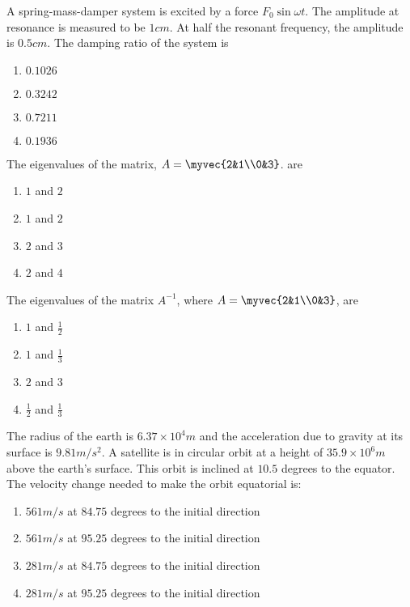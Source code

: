 	\item A spring-mass-damper system is excited by a force $F_0 \sin \omega t$. The amplitude at resonance is measured to be $1cm$. At half the resonant frequency, the amplitude is $0.5cm$. The damping ratio of the system is
		\begin{enumerate}
			\item $0.1026$
			\item $0.3242$
			\item $0.7211$
			\item $0.1936$
		\end{enumerate}

	\item The eigenvalues of the matrix, $A = \myvec{2&1\\0&3}$. are
		\begin{enumerate}
			\item $1$ and $2$
			\item $1$ and $2$
			\item $2$ and $3$
			\item $2$ and $4$
		\end{enumerate}

	\item The eigenvalues of the matrix $A^{-1}$, where $A = \myvec{2&1\\0&3}$, are
		\begin{enumerate}
			\item $1$ and $\frac{1}{2}$
			\item $1$ and $\frac{1}{3}$
			\item $2$ and $3$
			\item $\frac{1}{2}$ and $\frac{1}{3}$
		\end{enumerate}

	\item The radius of the earth is $6.37 \times 10^4 m$ and the acceleration due to gravity at its surface is $9.81 m / s^2$. A satellite is in circular orbit at a height of $35.9\times 10^6 m$ above the earth's surface. This orbit is inclined at $10.5$ degrees to the equator. The velocity change needed to make the orbit equatorial is:
		\begin{enumerate}
			\item $561 m / s$ at $84.75$ degrees to the initial direction
			\item $561 m / s$ at $95.25$ degrees to the initial direction
			\item $281 m / s$ at $84.75$ degrees to the initial direction
			\item $281 m / s$ at $95.25$ degrees to the initial direction
		\end{enumerate}

